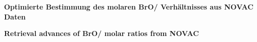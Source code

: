 \thispagestyle{empty}
\begin{center}
  \begin{minipage}[c][0.48\textheight][b]{0.9\textwidth}
    \small
    \textbf{Optimierte Bestimmung des molaren BrO/ Verhältnisses aus NOVAC Daten
    }\par
    \vspace{\baselineskip}
    
  \end{minipage}\par
  \vfill
  \begin{minipage}[c][0.48\textheight][b]{0.9\textwidth}
    \small
    \textbf{Retrieval advances of BrO/ molar ratios from NOVAC
    }\par
    \vspace{\baselineskip}
    
  \end{minipage}
\end{center}
